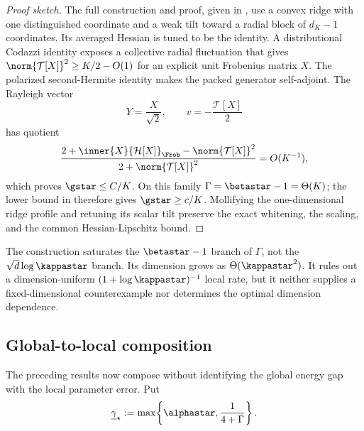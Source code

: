 \begin{proof}[Proof sketch]
The full construction and proof, given in
, use a convex ridge with one
distinguished coordinate and a weak tilt toward a radial block of
\(d_K-1\) coordinates.  Its averaged Hessian is tuned to be the identity.
A distributional Codazzi identity exposes a collective radial fluctuation
that gives
\(\norm{\mathcal T[X]}^2\geq K/2-O(1)\) for an explicit unit
Frobenius matrix \(X\).  The polarized second-Hermite identity makes the
packed generator self-adjoint.  The Rayleigh vector
\[
  Y=\frac{X}{\sqrt2},
  \qquad
  v=-\frac{\mathcal T[X]}2
\]
has quotient
\[
  \frac{2+\inner{X}{\mathcal H[X]}_{\Frob}
    -\norm{\mathcal T[X]}^2}
       {2+\norm{\mathcal T[X]}^2}
  =O(K^{-1}),
\]
which proves \(\gstar\leq C/K\).  On this family
\(\Gamma=\betastar-1=\Theta(K)\); the lower bound in
 therefore gives
\(\gstar\geq c/K\).  Mollifying the one-dimensional ridge profile and
retuning its scalar tilt preserve the exact whitening, the scaling, and the
common Hessian-Lipschitz bound.
\end{proof}

\begin{remark}
\label{rem:local-ridge-scope}
The construction saturates the \(\betastar-1\) branch of \(\Gamma\), not the
\(\sqrt d\log\kappastar\) branch.  Its dimension grows as
\(\Theta(\kappastar^2)\).  It rules out a dimension-uniform
\((1+\log\kappastar)^{-1}\) local rate, but it neither supplies a
fixed-dimensional counterexample nor determines the optimal dimension
dependence.
\end{remark}

\subsection{Global-to-local composition}
\label{sec:local-global-to-local}

The preceding results now compose without identifying the global energy gap
with the local parameter error.  Put
\[
  \underline\gamma_\star
  :=\max\!\left\{\alphastar,\frac1{4+\Gamma}\right\}.
\]

